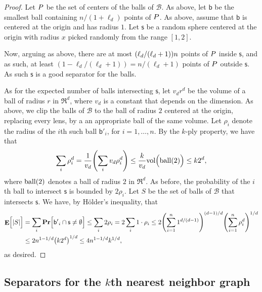 \documentclass[12pt]{article}
\theoremstyle{remark}\theoremheaderfont{\sf}\theorembodyfont{\upshape}\newtheorem{defn}[theorem]{Definition}
\renewcommand{\Re}{\mathbb{R}}
\newcommand{\BallSet}{\mathcal{B}}\newcommand{\BallSetA}{\mathcal{C}}
\newcommand{\SepSet}{S}
\newcommand{\sphere}{\mathsf{s}}
\renewcommand{\th}{th\xspace}
\newcommand{\ball}{\mathsf{b}}\newcommand{\ballA}{\mathsf{b'}}
\newcommand{\Vd}{v_d}\newcommand{\constD}{c_d}\newcommand{\constDbl}{\ell_d}\newcommand{\constDblTwo}{\ell_2}
\newcommand{\VolX}[1]{\mathrm{vol}\pth{#1}}
\newcommand{\ballX}[1]{\mathrm{ball}\pth{#1}}
\newcommand{\Holder}{H\"older\xspace}
\newcommand{\pth}[1]{\mleft({#1}\mright)}
\newcommand{\Ex}[2][\!]{\mathop{\mathbf{E}}#1\pbrcx{#2}}
\newcommand{\Prob}[1]{\mathop{\mathbf{Pr}}\!\pbrcx{#1}}
\newcommand{\cardin}[1]{\left| {#1} \right|}\newcommand{\norm}[1]{\left\| {#1} \right\|}
\newcommand{\pbrcx}[1]{\left[ {#1} \right]}
\newcommand{\rad}{\rho}\newcommand{\areaX}[1]{\mathrm{area}\pth{#1}}
\begin{document}
\begin{proof}
    Let ${P}$ be the set of centers of the balls of $\BallSet$. As
    above, let $\ball$ be the smallest ball containing
    $n/(1+\constDbl)$ points of ${P}$. As above, assume that
    $\ball$ is centered at the origin and has radius $1$. Let
    $\sphere$ be a random sphere centered at the origin with radius
    $x$ picked randomly from the range $[1,2]$.

    Now, arguing as above, there are at most $\pth{\constDbl
       /(\constDbl + 1)}n $ points of ${P}$ inside $\sphere$, and
    as such, at least $(1- \constDbl/(\constDbl + 1 )) =
    n/(\constDbl+1)$ points of ${P}$ outside $\sphere$. As such
    $\sphere$ is a good separator for the balls.

    As for the expected number of balls intersecting $\sphere$, let
    $\Vd r^d$ be the volume of a ball of radius $r$ in $\Re^d$, where
    $\Vd$ is a constant that depends on the dimension. As above, we
    clip the balls of $\BallSet$ to the ball of radius $2$ centered at
    the origin, replacing every lens, by a an appropriate ball of the
    same volume. Let $\rad_i$ denote the radius of the $i$\th such
    ball $\ballA_i$, for $i=1,\ldots, n$. By the $k$-ply property, we
    have that
    \begin{align*}
        \sum_i \rad_i^d=\frac{1}{\Vd} \pth{\sum_i \Vd \rad_i^d}\leq \frac{k}{\Vd} \VolX{\MakeSBig \ballX{2}}\leq k 2^d,
    \end{align*}
    where $\ballX{2}$ denotes a ball of radius $2$ in $\Re^d$. As
    before, the probability of the $i$\th ball to intersect $\sphere$
    is bounded by $2\rad_i$.  Let $\SepSet$ be the set of balls of
    $\BallSet$ that intersects $\sphere$. We have, by \Holder's
    inequality, that
    \begin{align*}
        \Ex{\cardin{\SepSet} \MakeBig\! }&=\sum_i \Prob{ \ballA_i \cap \sphere \ne \emptyset \MakeBig }\leq \sum_i 2\rad_i = 2 \sum_i 1 \cdot \rad_i\leq 2 \pth{\sum_{i=1}^n 1^{d/(d-1)}}^{(d-1)/d} \pth{\sum_{i=1}^n
           \rad_i^d}^{1/d}\\ &\leq 2 n^{1-1/d} \pth{k 2^d }^{1/d} \leq 4 n^{1-1/d} k^{1/d},
    \end{align*}
    as desired.
\end{proof}


\subsection{Separators for the $k$\th nearest neighbor graph}
\end{document}
